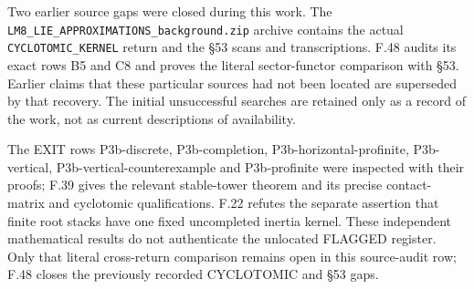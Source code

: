 Two earlier source gaps were closed during this work. The
\texttt{LM8\_LIE\_APPROXIMATIONS\_background.zip} archive contains
the actual \texttt{CYCLOTOMIC\_KERNEL} return and the \S53 scans and
transcriptions. F.48 audits its exact rows B5 and C8 and proves the
literal sector-functor comparison with \S53. Earlier claims that
these particular sources had not been located are superseded by
that recovery. The initial unsuccessful searches are retained only
as a record of the work, not as current descriptions of availability.

The EXIT rows P3b-discrete, P3b-completion,
P3b-horizontal-profinite, P3b-vertical,
P3b-vertical-counterexample and P3b-profinite were inspected with
their proofs; F.39 gives the relevant stable-tower theorem and its
precise contact-matrix and cyclotomic qualifications. F.22 refutes
the separate assertion that finite root stacks have one fixed
uncompleted inertia kernel. These independent mathematical results
do not authenticate the unlocated FLAGGED register. Only that
literal cross-return comparison remains open in this source-audit
row; F.48 closes the previously recorded CYCLOTOMIC and \S53 gaps.
